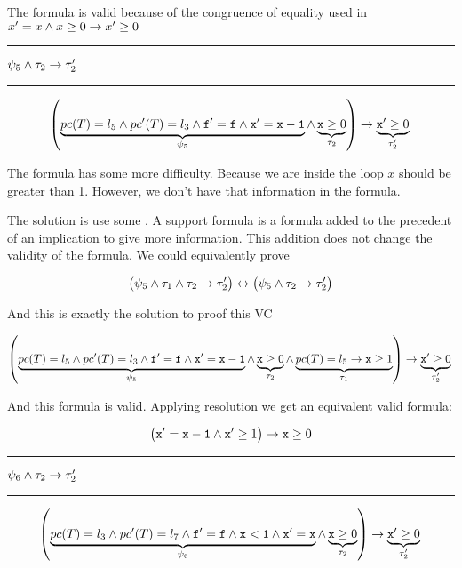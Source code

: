 	The formula is valid because of the congruence of equality used in  $x'=x \wedge x\geq 0 \to x'\geq 0$ 

	\rule{1cm}{0.2pt}\; $\psi_5 \wedge \tau_2 \to \tau_2'$ \;\rule{1cm}{0.2pt}
	

	\begin{dmath*}[indentstep={5em}]
		\left(
			\underbrace{\pc(T) = l_5 \andcond \pc'(T) = l_3 \andcond \mathtt{f'=f} \andcond \mathtt{x'=x-1}}_{\psi_5} \andcond \underbrace{\mathtt{x} \geq 0}_{\tau_2}
		\right) 
			\to \underbrace{\mathtt{x}' \geq 0}_{\tau_2'}\\\\
	\end{dmath*}

	The formula has some more difficulty. 
	Because we are inside the loop $x$ should be greater than 1.
	However, we don't have that information in the formula.
	
	The solution is use some .
	A support formula is a formula added to the precedent of an implication to give more information. 
	This addition does not change the validity of the formula.
	We could equivalently prove

	\[
		\left(\psi_5 \wedge \tau_1 \wedge \tau_2 \to \tau_2'\right) \leftrightarrow \left(\psi_5\wedge \tau_2\to\tau_2'\right)
	\]

	And this is exactly the solution to proof this \gls{VC}

	

	\begin{dmath*}[indentstep={5em}]
		\left(
			\underbrace{\pc(T) = l_5 \andcond \pc'(T) = l_3 \andcond \mathtt{f'=f} \andcond \mathtt{x'=x-1}}_{\psi_5} \andcond \underbrace{\mathtt{x} \geq 0}_{\tau_2} \andcond \underbrace{\pc(T) = l_5 \to \mathtt{x} \geq 1}_{\tau_1}
		\right) 
			\to \underbrace{\mathtt{x}' \geq 0}_{\tau_2'}\\\\
	\end{dmath*}

	And this formula is valid. Applying resolution we get an equivalent valid formula:

	\[
		\left( \mathtt{x'=x-1} \wedge \mathtt{x'}\geq 1\right) \to \mathtt{x} \geq 0
	\]


	\rule{1cm}{0.2pt}\; $\psi_6 \wedge \tau_2 \to \tau_2'$ \;\rule{1cm}{0.2pt}

	

	\begin{dmath*}[indentstep={5em}]
		\left(
			\underbrace{\pc(T) = l_3 \andcond \pc'(T) = l_7 \andcond \mathtt{f'=f} \andcond \mathtt{x<1} \andcond \mathtt{x'=x} }_{\psi_6} \andcond \underbrace{\mathtt{x} \geq 0}_{\tau_2}
		\right) 
			\to \underbrace{\mathtt{x}' \geq 0}_{\tau_2'}\\\\
	\end{dmath*}

